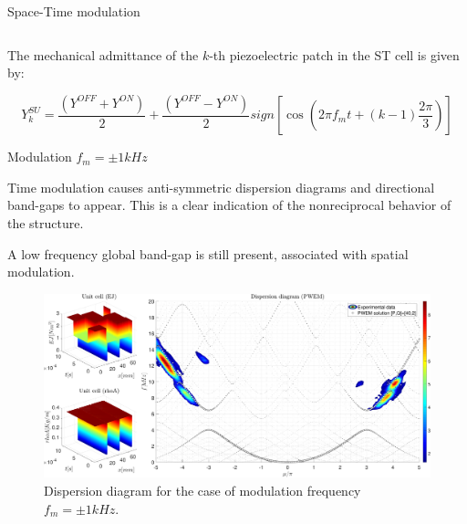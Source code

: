 \begin{frame}{Space-Time modulation}
\begin{columns}[c, onlytextwidth]
\begin{column}{0.45\textwidth}
        \end{column}

    \end{columns}

    The mechanical admittance of the $k$-th piezoelectric patch in the ST cell is given by:

    \begin{equation}
        Y_k^{SU} = \frac{(Y^{OFF} + Y^{ON})}{2} + \frac{(Y^{OFF} - Y^{ON})}{2} sign \left[ \cos \left( 2 \pi f_m t + (k-1) \frac{2\pi}{3} \right) \right]
    \end{equation}

\end{frame}



\begin{frame}{Modulation $f_m = \pm 1kHz$}


    Time modulation causes anti-symmetric dispersion diagrams and directional band-gaps to appear.
    This is a clear indication of the nonreciprocal behavior of the structure.

    A low frequency global band-gap is still present, associated with spatial modulation.

    \begin{figure}[H]
        \centering
        \includegraphics[width=\textwidth]{img/MATLAB/PWEM_EXP Sinusoidal (discrete) @1kHz.pdf}
        \caption{Dispersion diagram for the case of modulation frequency $f_m = \pm 1 kHz$.}
    \end{figure}

\end{frame}




